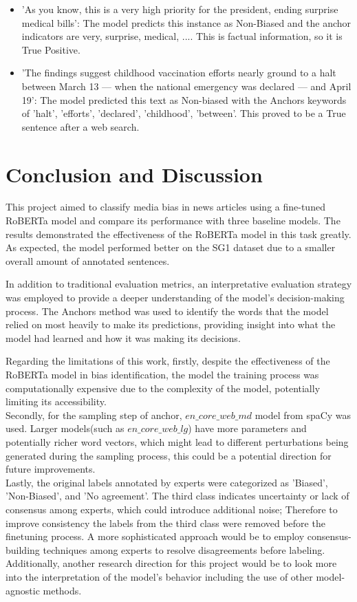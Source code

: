 \documentclass[11pt,a4paper]{article}
\begin{document}
\begin{itemize}
    \item 'As you know, this is a very high priority for the president, ending surprise medical bills': The model predicts this instance as Non-Biased and the anchor indicators are {very, surprise, medical, ...}. This is factual information, so it is True Positive.
    \item 'The findings suggest childhood vaccination efforts nearly ground to a halt between March 13 — when the national emergency was declared — and April 19': The model predicted this text as Non-biased with the Anchors keywords of 'halt', 'efforts', 'declared', 'childhood', 'between'. This proved to be a True sentence after a web search.
\end{itemize}
\section{Conclusion and Discussion}
This project aimed to classify media bias in news articles using a fine-tuned RoBERTa model and compare its performance with three baseline models. The results demonstrated the effectiveness of the RoBERTa model in this task greatly. As expected, the model performed better on the SG1 dataset due to a smaller overall amount of annotated sentences.

In addition to traditional evaluation metrics, an interpretative evaluation strategy was employed to provide a deeper understanding of the model’s decision-making process. The Anchors method was used to identify the words that the model relied on most heavily to make its predictions, providing insight into what the model had learned and how it was making its decisions.

Regarding the limitations of this work, firstly, despite the effectiveness of the RoBERTa model in bias identification, the model the training process was computationally expensive due to the complexity of the model, potentially limiting its accessibility.\\
Secondly, for the sampling step of anchor, $en\_core\_web\_md$ model from spaCy was used. Larger models(such as $en\_core\_web\_lg$) have more parameters and potentially richer word vectors, which might lead to different perturbations being generated during the sampling process, this could be a potential direction for future improvements.\\
Lastly, the original labels annotated by experts were categorized as 'Biased', 'Non-Biased', and 'No agreement'. The third class indicates uncertainty or lack of consensus among experts, which could introduce additional noise; Therefore to improve consistency the labels from the third class were removed before the finetuning process. A more sophisticated approach would be to employ consensus-building techniques among experts to resolve disagreements before labeling.\\
Additionally, another research direction for this project would be to look more into the interpretation of the model's behavior including the use of other model-agnostic methods.
\end{document}

